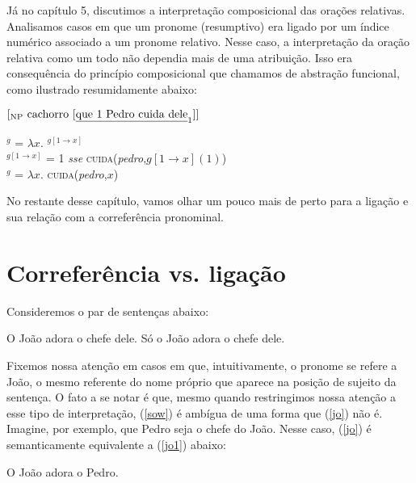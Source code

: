 Já no capítulo 5, discutimos a interpretação composicional das orações relativas. Analisamos casos em que um pronome (resumptivo) era ligado por um índice numérico associado a um pronome relativo. Nesse caso, a interpretação da oração relativa como um todo não dependia mais de uma atribuição. Isso era consequência do princípio composicional que chamamos de abstração funcional, como ilustrado resumidamente abaixo:

\begin{exe}
	\ex $[_{\text{NP}}\ \text{cachorro}\ [\text{\underline{que 1 Pedro cuida dele}}_{1}]]$
\end{exe}

\begin{exe}
	\ex {}$^{g}$ = $\lambda x.$ $^{g[1 \rightarrow x]}$\\
	$^{g[1 \rightarrow x]}$ = 1 \textit{sse} \textsc{cuida}(\textit{pedro},$g[1 \rightarrow x](1)$)\\
	$^{g}$ = $\lambda x.$ \textsc{cuida}(\textit{pedro},$x$)
\end{exe}

\n No restante desse capítulo, vamos olhar um pouco mais de perto para a ligação e sua relação com a correferência pronominal.  


\section{Correferência vs. ligação}

Consideremos o par de sentenças abaixo:

\begin{exe}
    \ex O João adora o chefe dele. \label{jo}
    \ex Só o João adora o chefe dele.  \label{sow}
\end{exe}

\n Fixemos nossa atenção em casos em que, intuitivamente, o pronome se refere a João, o mesmo referente do nome próprio que aparece na posição de sujeito da sentença. O fato a se notar é que, mesmo quando restringimos nossa atenção a esse tipo de interpretação, (\ref{sow}) é ambígua de uma forma que (\ref{jo}) não é. Imagine, por exemplo, que Pedro seja o chefe do João. Nesse caso, (\ref{jo}) é semanticamente equivalente a (\ref{jo1}) abaixo:
 
\begin{exe}
	\ex O João adora o Pedro. \label{jo1}
\end{exe}

